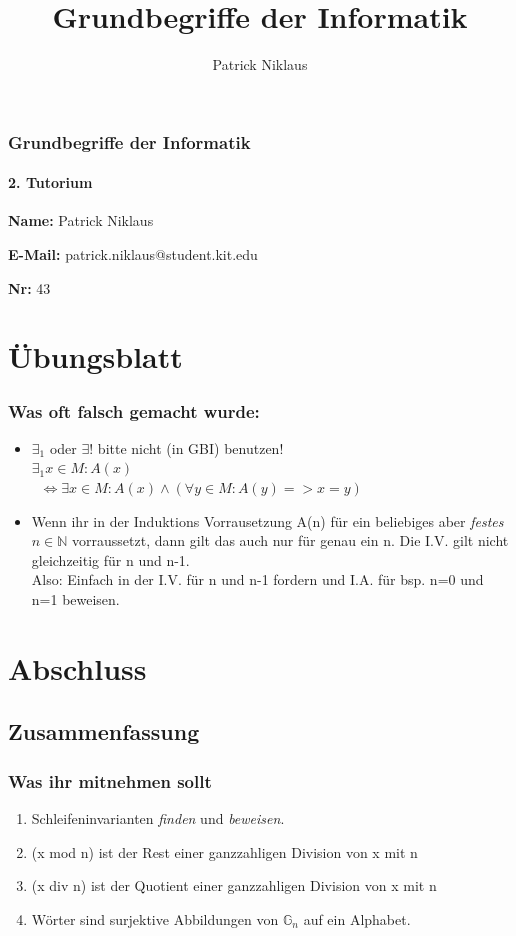 \documentclass{beamer}
\title{Grundbegriffe der Informatik}
\author{Patrick Niklaus}
\begin{document}
\begin{frame}
  \frametitle{Grundbegriffe der Informatik}
  \framesubtitle{2. Tutorium}
  \begin{description}
    \item \textbf{Name:} Patrick Niklaus
    \item \textbf{E-Mail:} patrick.niklaus@student.kit.edu
    \item \textbf{Nr:} 43
  \end{description}
\end{frame}

\section{Übungsblatt}
\begin{frame}
  \frametitle{Was oft falsch gemacht wurde:}
  \begin{itemize}
    \item ${\exists}_1$ oder $\exists !$ bitte nicht (in GBI) benutzen!\\
          ${\exists}_1 x \in M: A(x)$\\
          $\;\;\Leftrightarrow \exists x \in M: A(x) \wedge (\forall y \in M: A(y) => x = y)$
    \item Wenn ihr in der Induktions Vorrausetzung A(n) für ein beliebiges aber \emph{festes} $n \in \mathbb{N}$ vorraussetzt, dann gilt das auch nur für genau ein n. Die I.V. gilt nicht gleichzeitig für n und n-1.\\
     Also: Einfach in der I.V. für n und n-1 fordern und I.A. für bsp. n=0 und n=1 beweisen.
  \end{itemize}
\end{frame}





\section{Abschluss}
\subsection{Zusammenfassung}
\begin{frame}
  \frametitle{Was ihr mitnehmen sollt}
  \begin{enumerate}
    \item Schleifeninvarianten \emph{finden} und \emph{beweisen}.
    \item (x mod n) ist der Rest einer ganzzahligen Division von x mit n
    \item (x div n) ist der Quotient einer ganzzahligen Division von x mit n
    \item Wörter sind surjektive Abbildungen von $\mathbb{G}_n$ auf ein Alphabet.
   \end{enumerate}
\end{frame}
\end{document}
